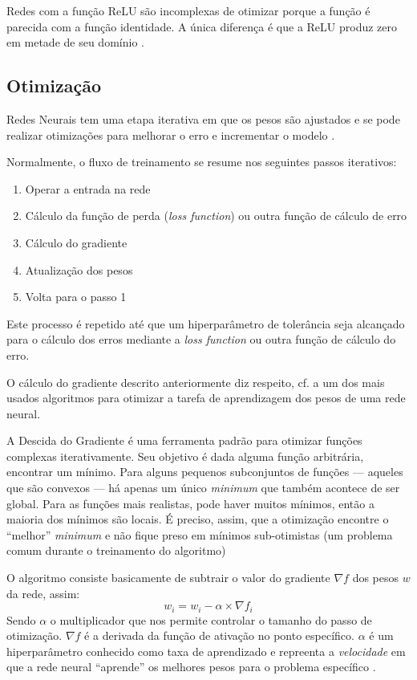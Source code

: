 Redes com a função ReLU são incomplexas de otimizar porque a função é parecida com a função identidade. A única diferença é que a ReLU produz zero em metade de seu domínio \cite{hagan_neural_1996}.

\subsection{Otimização}\label{otimização}
Redes Neurais tem uma etapa iterativa em que os pesos são ajustados e se pode realizar otimizações para melhorar o erro e incrementar o modelo \cite{haykin_redes_2001}.

Normalmente, o fluxo de treinamento se resume nos seguintes passos iterativos:
\begin{enumerate}\label{fluxo_treinamento}
	\item Operar a entrada na rede
	\item Cálculo da função de perda (\textit{loss function}) ou outra função de cálculo de erro
	\item Cálculo do gradiente
	\item Atualização dos pesos
	\item Volta para o passo 1
\end{enumerate}

Este processo é repetido até que um hiperparâmetro de tolerância seja alcançado para o cálculo dos erros mediante a \textit{loss function} ou outra função de cálculo do erro.

O cálculo do gradiente descrito anteriormente diz respeito, cf.  a um dos mais usados algoritmos para otimizar a tarefa de aprendizagem dos pesos de uma rede neural.

A Descida do Gradiente é uma ferramenta padrão para otimizar funções complexas iterativamente. Seu objetivo é dada alguma função arbitrária, encontrar um mínimo. Para alguns pequenos subconjuntos de funções --- aqueles que são convexos --- há apenas um único \textit{minimum} que também acontece de ser global. Para as funções mais realistas, pode haver muitos mínimos, então a maioria dos mínimos são locais. É preciso, assim, que a otimização encontre o ``melhor'' \textit{minimum} e não fique preso em mínimos sub-otimistas (um problema comum durante o treinamento do algoritmo) \cite{deep_learning_book_2019}

O algoritmo consiste basicamente de subtrair o valor do gradiente $\nabla f$ dos pesos $w$ da rede, assim:
\begin{equation}\label{gradiente}
	w_i = w_i - \alpha \times \nabla f_i
\end{equation}
Sendo $\alpha$ o multiplicador que nos permite controlar o tamanho do passo de otimização.  $\nabla f$ é a derivada da função de ativação no ponto específico. $\alpha$ é um hiperparâmetro conhecido como taxa de aprendizado e repreenta a \textit{velocidade} em que a rede neural ``aprende'' os melhores pesos para o problema específico \cite{haykin_redes_2001}.

